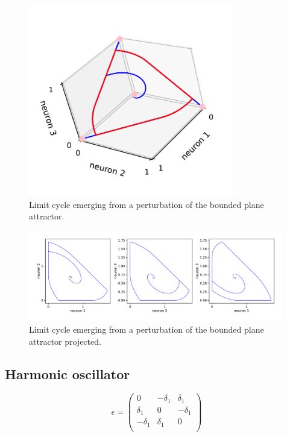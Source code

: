 \documentclass{article}
\theoremstyle{definition}
\theoremstyle{remark}
\begin{document}
\begin{figure}[H]
    \centering
    \includegraphics[width=0.8\textwidth]{figures/bpa3_limitcycle_triple.pdf}
    \caption{Limit cycle emerging from a perturbation of the bounded plane attractor.}
    \label{fig:bpa3_limitcycle_triple}
\end{figure}

\begin{figure}[H]
    \centering
    \includegraphics[width=0.99\textwidth]{figures/bpa3_limitcycle_2dproj.pdf}
    \caption{Limit cycle emerging from a perturbation of the bounded plane attractor projected.}
    \label{fig:bla3_limitcycle_triple_2d}
\end{figure}


\subsection{Harmonic oscillator}
\begin{equation}
\epsilon = 
\begin{pmatrix}
 0  &  -\delta_1 & \delta_1 \\
 \delta_1  &  0 & -\delta_1 \\
-\delta_1 & \delta_1 & 0 \\
\end{pmatrix}
\end{equation}
\end{document}
